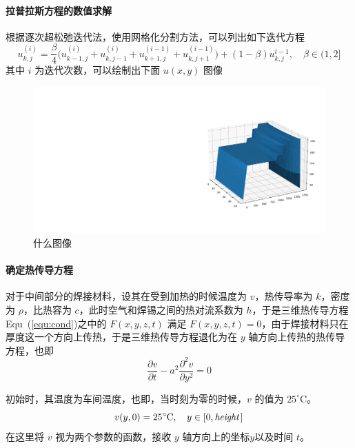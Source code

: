 \documentclass[../main.tex]{subfiles}
\begin{document}
\paragraph{拉普拉斯方程的数值求解} 根据逐次超松弛迭代法，使用网格化分割方法，可以列出如下迭代方程
\begin{equation}
u_{k,j} ^{(i)} = \frac{\beta}{4} \bigg( u_{k-1, j} ^{(i)} + u_{k,j-1} ^{(i)} + u_{k+1,j} ^{(i-1)}+ u _{k, j+ 1} ^{(i-1)} \bigg) + (1- \beta) u_{k,j} ^{i-1} ,\quad \beta \in (1, 2]
\end{equation}
其中 \(i\) 为迭代次数，可以绘制出下面 \(u ( x , y)\) 图像

\begin{figure}[H]
\centering
\includegraphics[scale = 0.5]{fig1.pdf}\caption{什么图像}
\end{figure}

\paragraph{确定热传导方程} 对于中间部分的焊接材料，设其在受到加热的时候温度为 \(v\)，热传导率为 \(k\)，密度为 \(\rho\)，比热容为 \(c\)，此时空气和焊锡之间的热对流系数为 \(h\)，于是三维热传导方程Equ~(\ref{equ:cond})之中的 \(F (x, y , z, t)\) 满足 \(F ( x , y , z ,t ) = 0\)，由于焊接材料只在厚度这一个方向上传热，于是三维热传导方程退化为在 \(y\) 轴方向上传热的热传导方程，也即
\begin{equation}\label{equ:one-dim}
\frac{\partial v}{\partial t} - a ^{2} \frac{\partial^{2} v }{\partial y ^{2}} = 0
\end{equation}

初始时，其温度为车间温度，也即，当时刻为零的时候，\(v\) 的值为 \(25 ^{\circ}\mathrm{C}\)。
\begin{equation}
v (y, 0) = 25 ^{\circ}\mathrm{C}, \quad y \in [0, {\it height}\kern 1pt]
\end{equation}
在这里将 \(v\) 视为两个参数的函数，接收 \(y\) 轴方向上的坐标\(y\)以及时间 \(t\)。
\end{document}
